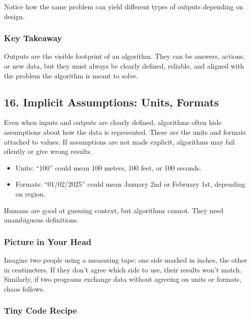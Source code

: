 \documentclass[
  letterpaper,
  DIV=11,
  numbers=noendperiod]{scrreprt}
\providecommand{\tightlist}{%
  \setlength{\itemsep}{0pt}\setlength{\parskip}{0pt}}
\begin{document}
Notice how the same problem can yield different types of outputs
depending on design.

\subsubsection{Key Takeaway}\label{key-takeaway-13}

Outputs are the visible footprint of an algorithm. They can be answers,
actions, or new data, but they must always be clearly defined, reliable,
and aligned with the problem the algorithm is meant to solve.

\subsection{16. Implicit Assumptions: Units,
Formats}\label{implicit-assumptions-units-formats}

Even when inputs and outputs are clearly defined, algorithms often hide
assumptions about how the data is represented. These are the units and
formats attached to values. If assumptions are not made explicit,
algorithms may fail silently or give wrong results.

\begin{itemize}
\tightlist
\item
  Units: ``100'' could mean 100 meters, 100 feet, or 100 seconds.
\item
  Formats: ``01/02/2025'' could mean January 2nd or February 1st,
  depending on region.
\end{itemize}

Humans are good at guessing context, but algorithms cannot. They need
unambiguous definitions.

\subsubsection{Picture in Your Head}\label{picture-in-your-head-15}

Imagine two people using a measuring tape: one side marked in inches,
the other in centimeters. If they don't agree which side to use, their
results won't match. Similarly, if two programs exchange data without
agreeing on units or formats, chaos follows.

\subsubsection{Tiny Code Recipe}\label{tiny-code-recipe-14}
\end{document}

